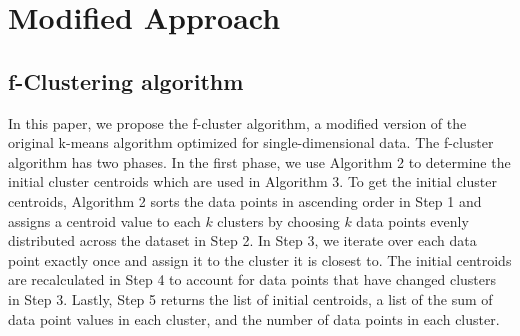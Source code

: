 \documentclass[conference,compsoc]{IEEEtran}
\begin{document}
\section{Modified Approach}

\subsection{f-Clustering algorithm}

In this paper, we propose the f-cluster algorithm, a modified version of the original k-means algorithm optimized for single-dimensional data. The f-cluster algorithm has two phases. In the first phase, we use Algorithm 2 to determine the initial cluster centroids which are used in Algorithm 3. To get the initial cluster centroids, Algorithm 2 sorts the data points in ascending order in Step 1 and assigns a centroid value to each $k$ clusters by choosing $k$ data points evenly distributed across the dataset in Step 2. In Step 3, we iterate over each data point exactly once and assign it to the cluster it is closest to. The initial centroids are recalculated in Step 4 to account for data points that have changed clusters in Step 3. Lastly, Step 5 returns the list of initial centroids, a list of the sum of data point values in each cluster, and the number of data points in each cluster.
\end{document}
